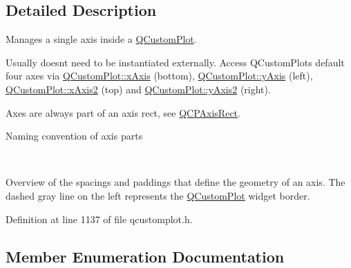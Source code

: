 \subsection{Detailed Description}
Manages a single axis inside a \hyperlink{class_q_custom_plot}{Q\+Custom\+Plot}. 

Usually doesn\textquotesingle{}t need to be instantiated externally. Access Q\+Custom\+Plot\textquotesingle{}s default four axes via \hyperlink{class_q_custom_plot_a9a79cd0158a4c7f30cbc702f0fd800e4}{Q\+Custom\+Plot\+::x\+Axis} (bottom), \hyperlink{class_q_custom_plot_af6fea5679725b152c14facd920b19367}{Q\+Custom\+Plot\+::y\+Axis} (left), \hyperlink{class_q_custom_plot_ada41599f22cad901c030f3dcbdd82fd9}{Q\+Custom\+Plot\+::x\+Axis2} (top) and \hyperlink{class_q_custom_plot_af13fdc5bce7d0fabd640f13ba805c0b7}{Q\+Custom\+Plot\+::y\+Axis2} (right).

Axes are always part of an axis rect, see \hyperlink{class_q_c_p_axis_rect}{Q\+C\+P\+Axis\+Rect}.  \begin{center}Naming convention of axis parts\end{center}  ~\newline
  \begin{center}Overview of the spacings and paddings that define the geometry of an axis. The dashed gray line on the left represents the \hyperlink{class_q_custom_plot}{Q\+Custom\+Plot} widget border.\end{center}  

Definition at line 1137 of file qcustomplot.\+h.



\subsection{Member Enumeration Documentation}
\hypertarget{class_q_c_p_axis_ae2bcc1728b382f10f064612b368bc18a}{}
